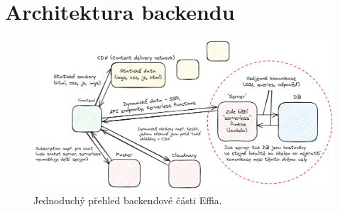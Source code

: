 \documentclass[12pt, a4paper,
openright
]{report}
\begin{document}
\section{Architektura backendu}
\begin{figure}[h!]
	\centering %
	\includegraphics[width=1\linewidth]{image/effio-architecture-simple.png} 
	\caption{Jednoduchý přehled backendové části Effia.} %
	\label{fig:effio-architecture} %
\end{figure}
\end{document}
